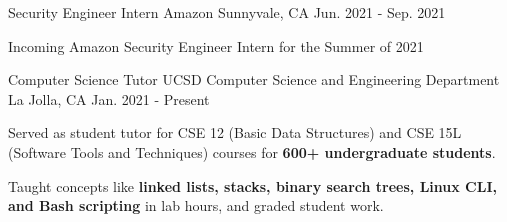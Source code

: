 

\begin{cventries}

\cventry
  {Security Engineer Intern} %
  {Amazon} %
  {Sunnyvale, CA} %
  {Jun. 2021 - Sep. 2021} %
  {
    \begin{cvitems} %
      \item {Incoming Amazon Security Engineer Intern for the Summer of 2021}
    \end{cvitems}
  }

  \cventry
    {Computer Science Tutor} %
    {UCSD Computer Science and Engineering Department} %
    {La Jolla, CA} %
    {Jan. 2021 - Present} %
    {
      \begin{cvitems} %
        \item {Served as student tutor for CSE 12 (Basic Data Structures) and CSE 15L (Software Tools and Techniques) courses for \textbf{600+ undergraduate students}.}
        \item {Taught concepts like \textbf{linked lists, stacks, binary search trees, Linux CLI, and Bash scripting} in lab hours, and graded student work.}
      \end{cvitems}
    }



\end{cventries}
